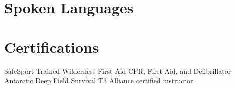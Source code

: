 \documentclass[a4paper,12pt,sans,colorlinks]{moderncv}
\begin{document}
\section{Spoken Languages}


\section{Certifications}

{
    SafeSport Trained
}
{
    Wilderness First-Aid
}
{
    CPR, First-Aid, and Defibrillator
}
{
    Antarctic Deep Field Survival
}
{
    T3 Alliance certified instructor
}
\end{document}
